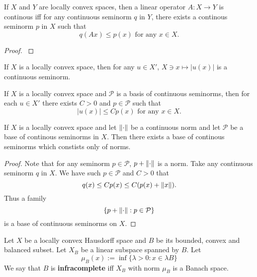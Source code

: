 \documentclass[main.tex]{subfiles}
\begin{document}
\begin{theorem}
If $X$ and $Y$ are locally convex spaces, then a linear operator $A:X\to Y$ is continous iff for any continuous seminorm $q$ in $Y$, there exists a continous seminorm $p$ in $X$ such that
\begin{equation}
q(Ax) \leq p(x) \text{ for any } x\in X.
\end{equation}
\end{theorem}
\begin{proof}
\cite[See][Locally convex spaces. Seminorms.]{treves1970}
\end{proof}

\begin{fact}
If $X$ is a locally convex space, then for any $u\in X'$, $X\ni x\mapsto |u(x)|$ is a continuous seminorm. 
\end{fact}

\begin{corollary}
If $X$ is a locally convex space and $\mathcal{P}$ is a basis of continuous seminorms, then for each $u\in X'$ there exists $C>0$ and $p\in \mathcal{P}$ such that
\begin{equation}
|u(x)| \leq C p(x) \text{ for any } x\in X.
\end{equation}
\end{corollary}

\begin{theorem}
If $X$ is a locally convex space and let $\norm{\cdot}$ be a continuous norm and let $\mathcal{P}$ be a base of continous seminorms in $X$. Then there exists a base of continous seminorms which constists only of norms.  
\end{theorem}
\begin{proof}
Note that for any seminorm $p\in \mathcal{P}$, $p + \norm{\cdot}$ is a norm. Take any continuous seminorm $q$ in $X$. We have such $p\in \mathcal{P}$ and $C > 0$ that 
\begin{equation}
q(x)\leq Cp(x) \leq C(p(x) + \norm{x}).
\end{equation}
Thus a family
\begin{equation}
\{p + \norm{\cdot}: p\in \mathcal{P}\}
\end{equation}
is a base of continuous seminorms on $X$.
\end{proof}

\begin{definition}
Let $X$ be a locally convex Hausdorff space and $B$ be its bounded, convex and balanced subset. Let $X_B$ be a linear subspace spanned by $B$.
Let
\begin{equation}
\mu_B(x):= \inf\{\lambda > 0 : x\in \lambda B\}
\end{equation}
We say that $B$ is \textbf{infracomplete} iff $X_B$ with norm $\mu_B$ is a Banach space.
\end{definition}
\end{document}
